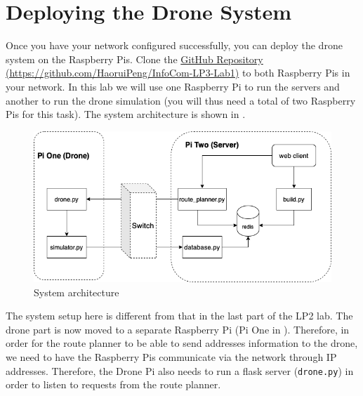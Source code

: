 \documentclass{article}
\begin{document}
\section{Deploying the Drone System}
Once you have your network configured successfully, you can deploy the drone system on the Raspberry Pis. Clone the {\color{blue}\href{https://github.com/HaoruiPeng/InfoCom-LP3-Lab1}{GitHub Repository}} \href{https://github.com/HaoruiPeng/InfoCom-LP3-Lab1}{(https://github.com/HaoruiPeng/InfoCom-LP3-Lab1)} to both Raspberry Pis in your network. In this lab we will use one Raspberry Pi to run the servers and another to run the drone simulation (you will thus need a total of two Raspberry Pis for this task). The system architecture is shown in .
\begin{figure}
    \centering
    \includegraphics[width=\linewidth]{architecture.png}
    \caption{System architecture}
    \label{fig:sys}
\end{figure}

The system setup here is different from that in the last part of the LP2 lab. The drone part is now moved to a separate Raspberry Pi (Pi One in ). Therefore, in order for the route planner to be able to send addresses information to the drone, we need to have the Raspberry Pis communicate via the network through IP addresses. Therefore, the Drone Pi also needs to run a flask server (\verb!drone.py!) in order to listen to requests from the route planner.
\end{document}
